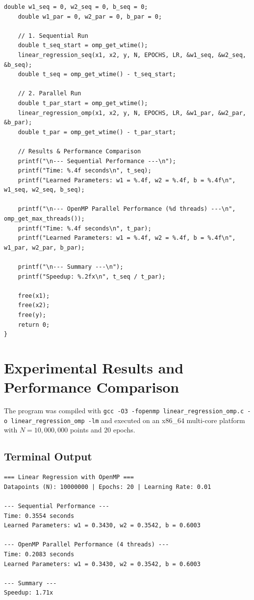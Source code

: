 \documentclass[12pt]{article}
\begin{document}
\begin{lstlisting}[style=code]
    double w1_seq = 0, w2_seq = 0, b_seq = 0;
    double w1_par = 0, w2_par = 0, b_par = 0;

    // 1. Sequential Run
    double t_seq_start = omp_get_wtime();
    linear_regression_seq(x1, x2, y, N, EPOCHS, LR, &w1_seq, &w2_seq, &b_seq);
    double t_seq = omp_get_wtime() - t_seq_start;

    // 2. Parallel Run
    double t_par_start = omp_get_wtime();
    linear_regression_omp(x1, x2, y, N, EPOCHS, LR, &w1_par, &w2_par, &b_par);
    double t_par = omp_get_wtime() - t_par_start;

    // Results & Performance Comparison
    printf("\n--- Sequential Performance ---\n");
    printf("Time: %.4f seconds\n", t_seq);
    printf("Learned Parameters: w1 = %.4f, w2 = %.4f, b = %.4f\n", w1_seq, w2_seq, b_seq);

    printf("\n--- OpenMP Parallel Performance (%d threads) ---\n", omp_get_max_threads());
    printf("Time: %.4f seconds\n", t_par);
    printf("Learned Parameters: w1 = %.4f, w2 = %.4f, b = %.4f\n", w1_par, w2_par, b_par);

    printf("\n--- Summary ---\n");
    printf("Speedup: %.2fx\n", t_seq / t_par);

    free(x1);
    free(x2);
    free(y);
    return 0;
}
\end{lstlisting}

\newpage
\section{Experimental Results and Performance Comparison}
The program was compiled with \texttt{gcc -O3 -fopenmp linear\_regression\_omp.c -o linear\_regression\_omp -lm} and executed on an x86\_64 multi-core platform with $N = 10,000,000$ points and $20$ epochs.

\subsection{Terminal Output}
\begin{lstlisting}[style=output]
=== Linear Regression with OpenMP ===
Datapoints (N): 10000000 | Epochs: 20 | Learning Rate: 0.01

--- Sequential Performance ---
Time: 0.3554 seconds
Learned Parameters: w1 = 0.3430, w2 = 0.3542, b = 0.6003

--- OpenMP Parallel Performance (4 threads) ---
Time: 0.2083 seconds
Learned Parameters: w1 = 0.3430, w2 = 0.3542, b = 0.6003

--- Summary ---
Speedup: 1.71x
\end{lstlisting}
\end{document}
